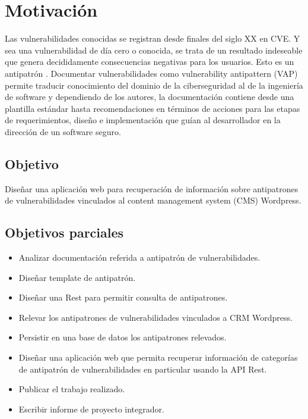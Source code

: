 \chapter{Motivación}
Las vulnerabilidades conocidas se registran desde finales del siglo XX en CVE. Y sea una vulnerabilidad de día cero o conocida, se trata de un resultado indeseable que genera decididamente consecuencias negativas para los usuarios. Esto es un antipatrón \cite{Brown_1998}\cite{Corry_2021}. Documentar vulnerabilidades como vulnerability antipattern (VAP) permite traducir conocimiento del dominio de la ciberseguridad\cite{CYBOK} al de la ingeniería de software\cite{SWEBoK} y dependiendo de los autores, la documentación contiene desde una plantilla estándar hasta recomendaciones en términos de acciones para las etapas de requerimientos, diseño e implementación\cite{Nafees_2019} que guían al desarrollador en la dirección de un software seguro.

\section{Objetivo}

Diseñar una aplicación web para recuperación de información sobre antipatrones de vulnerabilidades vinculados al content management system (CMS) Wordpress.

\section{Objetivos parciales}

\begin{itemize}
    \item Analizar documentación referida a antipatrón de vulnerabilidades.
    \item Diseñar template de antipatrón.
    \item Diseñar una  Rest para permitir consulta de antipatrones.
    \item Relevar los antipatrones de vulnerabilidades vinculados a CRM Wordpress.
    \item Persistir en una base de datos los antipatrones relevados.
    \item Diseñar una aplicación web que permita recuperar información de categorías de antipatrón de vulnerabilidades en particular usando la API Rest.
    \item Publicar el trabajo realizado.
    \item Escribir informe de proyecto integrador.
\end{itemize}

